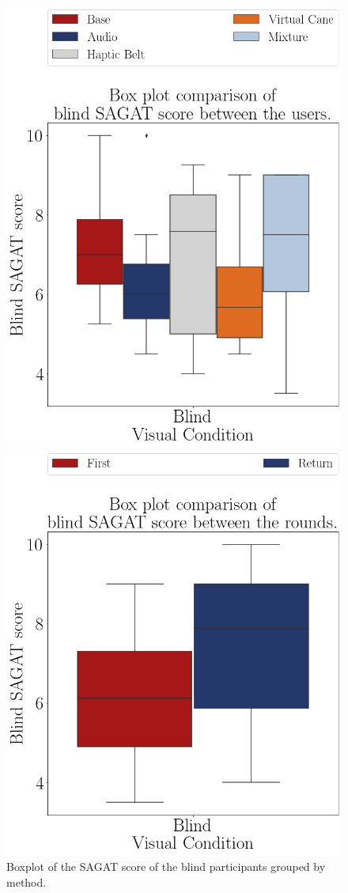 \begin{figure}[!htb]
    \centering
    \begin{minipage}{0.45\textwidth}
        \centering
        \includegraphics[width = 0.8\linewidth]{Resultados/Sagat/Figuras/png/boxplot_sagat_blind_scene.png}
        \caption{Boxplot of the SAGAT score of the blind participants grouped by method.}
        \label{fig:boxplot_sagat_blind_scene}
    \end{minipage}
    \begin{minipage}{0.45\textwidth}
        \centering
        \includegraphics[width = 0.8\linewidth]{Resultados/Sagat/Figuras/png/boxplot_sagat_blind_rounds.png}

\end{minipage}
\end{figure}
